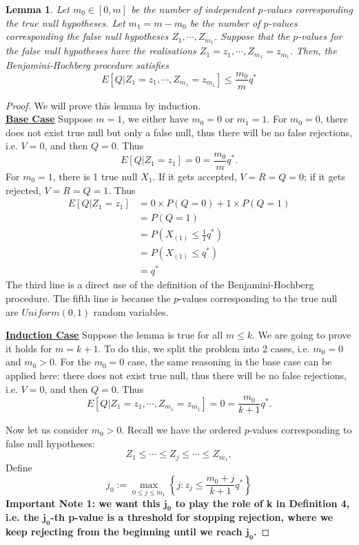 \documentclass[12pt]{article}
\theoremstyle{plain}
\newtheorem{lemma}{Lemma}
\theoremstyle{definition}
\theoremstyle{remark}
\begin{document}
\begin{lemma}\cite{5.3}\cite{5.7}
Let $m_0\in[0,m]$ be the number of independent $p$-values corresponding the true null hypotheses. Let $m_1=m-m_0$ be the number of $p$-values corresponding the false null hypotheses $Z_1,\cdots,Z_{m_1}$. Suppose that the $p$-values for the false null hypotheses have the realisations $Z_1=z_1,\cdots,Z_{m_1}=z_{m_1}.$
Then, the Benjamini-Hochberg procedure satisfies\[
E[Q|Z_1=z_1,\cdots,Z_{m_1}=z_{m_1}]\leq \frac{m_0}{m}q^*
\]
\end{lemma}

\begin{proof} \cite{5.3} We will prove this lemma by induction.\\
\underline{\textbf{Base Case}}\; Suppose $m=1$, we either have $m_0=0$ or $m_1=1$. For $m_0=0$, there does not exist true null but only a false null, thus there will be no false rejections, i.e. $V=0$, and then $Q=0$. Thus $$E[Q|Z_1=z_1]=0=\frac{m_0}{m}q^*.$$
For $m_0=1$, there is 1 true null $X_1$. If it gets accepted, $V=R=Q=0$; if it gets rejected, $V=R=Q=1$. Thus
\begin{align*}
    E[Q|Z_1=z_1]&=0\times P(Q=0)+1\times P(Q=1)\\
    &=P(Q=1)\\
    &=P(X_{(1)}\leq \frac{1}{1}q^*)\\
    &=P(X_{(1)}\leq q^*)\\
    &=q^*
\end{align*}
The third line is a direct use of the definition of the Benjamini-Hochberg procedure. The fifth line is because the $p$-values corresponding to the true null are $Uniform(0,1)$ random variables.

\underline{\textbf{Induction Case}}\; Suppose the lemma is true for all $m\leq k$. We are going to prove it holds for $m=k+1$. To do this, we split the problem into 2 cases, i.e. $m_0=0$ and $m_0>0$. For the $m_0=0$ case, the same reasoning in the base case can be applied here: there does not exist true null, thus there will be no false rejections, i.e. $V=0$, and then $Q=0$. Thus $$E[Q|Z_1=z_1,\cdots,Z_{m_1}=z_{m_1}]=0=\frac{m_0}{k+1}q^*.$$

Now let us consider $m_0>0$. Recall we have the ordered $p$-values corresponding to false null hypotheses: 
$$Z_1\leq \cdots\leq Z_j\leq \cdots\leq Z_{m_1},$$ 
Define \[
j_0:=\max_{0\leq j\leq m_1}\left\{j:z_j\leq
\frac{m_0+j}{k+1}q^*\right\}
\]
\textbf{Important Note 1: we want this $\mathbf{j_0}$ to play the role of k in Definition 4, i.e. the $\mathbf{j_0}$-th p-value is a threshold for stopping rejection, where we keep rejecting from the beginning until we reach $\mathbf{j_0}$.}


\end{proof}
\end{document}
